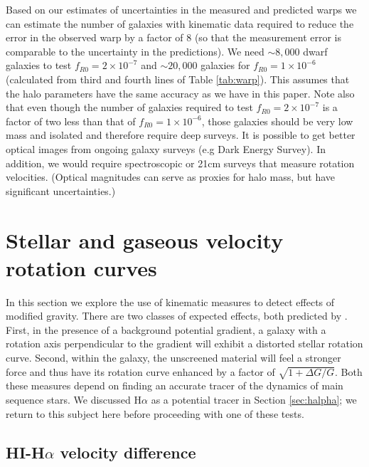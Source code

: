 \documentclass[useAMS,usenatbib,twocolumn]{mn2e}
\newcommand{\ha}{H$\alpha$}
\begin{document}
Based on our estimates of
uncertainties in the measured and predicted warps we can estimate
the number of galaxies with kinematic data required to
reduce the error in the observed warp by a factor of 8 (so that
the measurement error is comparable to the uncertainty in the predictions). 
We need $\sim 8,000$ dwarf galaxies to test $f_{R0} =
2\times10^{-7}$ and $\sim 20,000$ galaxies for $f_{R0} =
1\times10^{-6}$ (calculated from third and fourth lines of Table
\ref{tab:warp}). This assumes that the halo parameters have the same accuracy as we have in
this paper.  Note also that even though the number of
galaxies required to test $f_{R0} = 2\times10^{-7}$ is a factor of two
less than that of $f_{R0} = 1\times10^{-6}$, those galaxies should be
very low mass and isolated and therefore require deep surveys. It is
possible to get better optical images from ongoing 
galaxy surveys (e.g Dark Energy Survey). In addition, we would 
require spectroscopic or 21cm surveys that measure rotation velocities. 
(Optical magnitudes can serve as proxies for halo mass, but have significant
uncertainties.)







\section{Stellar and gaseous velocity rotation curves}
\label{sec:rotationcurves}

In this section we explore the use of kinematic measures to detect
effects of modified gravity.  There are two classes of expected effects,
both predicted by \citet{bhuvjake2011}.
First, in the presence of a background potential gradient, a galaxy
with a rotation axis perpendicular to the gradient will exhibit a distorted
stellar rotation curve.  Second, within the galaxy, the unscreened material
will feel a stronger force and thus have its rotation curve enhanced by
a factor of $\sqrt{1 + \Delta G/G}$.  Both these measures depend on finding
an accurate tracer of the dynamics of main sequence stars.  We discussed
\ha{} as a potential tracer in Section \ref{sec:halpha}; we return to this
subject here before proceeding with one of these tests.

\subsection{HI-H$\alpha$ velocity difference}\label{sec:hihalpha}
\end{document}
